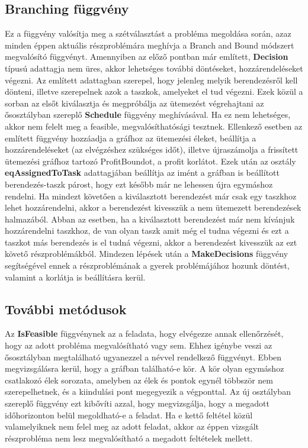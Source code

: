\subsection{Branching függvény}
Ez a függvény valósítja meg a szétválasztást a probléma megoldása során, azaz minden éppen aktuális részproblémára meghívja a Branch and Bound módszert megvalósító függvényt.
Amennyiben az előző pontban már említett, \textbf{Decision} típusú adattagja nem üres, akkor lehetséges további döntéseket, hozzárendeléseket végezni.
Az említett adattagban szerepel, hogy jelenleg melyik berendezésről kell dönteni, illetve szerepelnek azok a taszkok, amelyeket el tud végezni.
Ezek közül a sorban az elsőt kiválasztja és megpróbálja az ütemezést végrehajtani az ősosztályban szereplő \textbf{Schedule} függvény meghívásával.
Ha ez nem lehetséges, akkor nem felelt meg a feasible, megvalósíthatósági tesztnek.
Ellenkező esetben az említett függvény hozzáadja a gráfhoz az ütemezési éleket, beállítja a hozzárendeléseket (az elvégzéshez szükséges időt), illetve újraszámolja a frissített ütemezési gráfhoz tartozó ProfitBoundot, a profit korlátot.
Ezek után az osztály \textbf{eqAssignedToTask} adattagjában beállítja az imént a gráfban is beállított berendezés-taszk párost, hogy ezt később már ne lehessen újra egymáshoz rendelni.
Ha mindezt követően a kiválasztott berendezést már csak egy taszkhoz lehet hozzárendelni, akkor a berendezést kivesszük a nem ütemezett berendezések halmazából.
Abban az esetben, ha a kiválasztott berendezést már nem kívánjuk hozzárendelni taszkhoz, de van olyan taszk amit még el tudna végezni és ezt a taszkot más berendezés is el tudná végezni, akkor a berendezést kivesszük az ezt követő részproblémákból.
Mindezen lépések után a \textbf{MakeDecisions} függvény segítségével ennek a részproblémának a gyerek problémájához hozunk döntést, valamint a korlátja is beállításra kerül.

\subsection{További metódusok}
Az \textbf{IsFeasible} függvénynek az a feladata, hogy elvégezze annak ellenőrzését, hogy az adott probléma megvalósítható vagy sem.
Ehhez igénybe veszi az ősosztályban megtalálható ugyanezzel a névvel rendelkező függvényt.
Ebben  megvizsgálásra kerül, hogy a gráfban található-e kör.
A kör olyan egymáshoz csatlakozó élek sorozata, amelyben az élek és pontok egynél többször nem szerepelhetnek, és a kiindulási pont megegyezik a végponttal.
Az új osztályban szereplő függvény ezt kibővíti azzal, hogy megvizsgálja, hogy a megadott időhorizonton belül megoldható-e a feladat.
Ha e kettő feltétel közül valamelyiknek nem felel meg az adott feladat, akkor az éppen vizsgált részprobléma nem lesz megvalósítható a megadott feltételek mellett.

